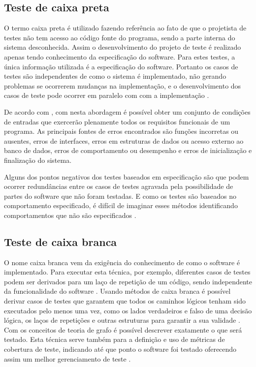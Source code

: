\subsection{Teste de caixa preta}

O termo caixa preta é utilizado fazendo referência ao fato de que o projetista de testes não tem acesso ao código fonte do programa, sendo a parte interna do sistema desconhecida.  Assim o desenvolvimento do projeto de teste é realizado apenas tendo conhecimento da especificação do software. Para estes testes, a única informação utilizada é a especificação do software. Portanto os casos de testes são independentes de como o sistema é implementado, não gerando problemas se ocorrerem mudanças na implementação, e o desenvolvimento dos casos de teste pode ocorrer em paralelo com com a implementação \cite{jorgensen2016software}.

De acordo com \cite{pressman2005software}, com  nesta abordagem é possível obter um conjunto de condições de entradas que exercerão plenamente todos os requisitos funcionais de um programa. As principais fontes de erros encontrados são funções incorretas ou ausentes, erros de interfaces, erros em estruturas de dados ou acesso externo ao banco de dados, erros de comportamento ou desempenho e erros de inicialização e finalização do sistema.

Alguns dos pontos negativos dos testes baseados em especificação são que podem ocorrer redundâncias entre os casos de testes agravada pela possibilidade de partes do software que não foram testadas. E como os testes são baseados no comportamento especificado, é difícil de imaginar esses métodos identificando comportamentos que não são especificados \cite{jorgensen2016software}.

\subsection{Teste de caixa branca}

O nome caixa branca vem da exigência do conhecimento de como o software é implementado. Para executar esta técnica, por exemplo, diferentes casos de testes podem ser derivados para um laço de repetição de um código, sendo independente da funcionalidade do software \cite{graham2008foundations}. Usando métodos de caixa branca é possível derivar casos de testes que garantem que todos os caminhos lógicos tenham sido executados pelo menos uma vez, como os lados verdadeiros e falso de uma decisão lógica, os laços de repetições e outras estruturas para garantir a sua validade \cite{pressman2005software}. Com os conceitos de teoria de grafo é possível descrever exatamente o que será testado. Esta técnica serve também para a definição e uso de métricas de cobertura de teste, indicando até que ponto o software foi testado oferecendo assim um melhor gerenciamento de teste \cite{jorgensen2016software}.

